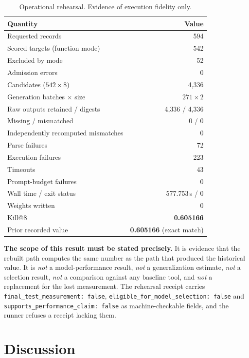 \documentclass[10pt,conference,letterpaper]{IEEEtran}
\makeatletter
\newcommand{\killk}[1]{Kill@#1}
\makeatother
\begin{document}
\begin{table}[t]
\caption{Operational rehearsal. Evidence of execution fidelity only.}
\label{tab:rehearsal}
\centering
\footnotesize
\begin{tabular}{@{}lr@{}}
\toprule
Quantity & Value \\
\midrule
Requested records & 594 \\
Scored targets (function mode) & 542 \\
Excluded by mode & 52 \\
Admission errors & 0 \\
Candidates ($542 \times 8$) & 4{,}336 \\
Generation batches $\times$ size & $271 \times 2$ \\
Raw outputs retained / digests & 4{,}336 / 4{,}336 \\
Missing / mismatched & 0 / 0 \\
Independently recomputed mismatches & 0 \\
Parse failures & 72 \\
Execution failures & 223 \\
Timeouts & 43 \\
Prompt-budget failures & 0 \\
Wall time / exit status & 577.753\,s / 0 \\
Weights written & 0 \\
\midrule
\killk{8} & \textbf{0.605166} \\
Prior recorded value & \textbf{0.605166} (exact match) \\
\bottomrule
\end{tabular}
\end{table}

\textbf{The scope of this result must be stated precisely.} It is evidence that
the rebuilt path computes the same number as the path that produced the
historical value. It is \emph{not} a model-performance result, \emph{not} a
generalization estimate, \emph{not} a selection result, \emph{not} a comparison
against any baseline tool, and \emph{not} a replacement for the lost
measurement. The rehearsal receipt carries
\texttt{final\_test\_measurement: false},
\texttt{eligible\_for\_model\_selection: false} and
\texttt{supports\_performance\_claim: false} as machine-checkable fields, and
the runner refuses a receipt lacking them.

\section{Discussion}
\end{document}
